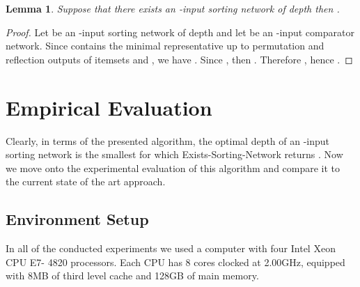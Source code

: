 \documentclass[13pt,a4paper]{article}
\newtheorem{lemma}[theorem]{Lemma}
\begin{document}
\begin{lemma}
\label{AlgoCorrectExistanceLemma}
Suppose that there exists an -input sorting network of depth  then .
\end{lemma}

\begin{proof}
Let  be an -input sorting network of depth  and let  be an -input comparator network. Since  contains the minimal representative up to permutation and reflection outputs of itemsets and , we have . Since , then . Therefore , hence .
\end{proof}





\section{Empirical Evaluation}
\label{sec:experiments}

Clearly, in terms of the presented algorithm, the optimal depth of an -input sorting network is the smallest  for which Exists-Sorting-Network returns . Now we move onto the experimental evaluation of this algorithm and compare it to the current state of the art approach.

\subsection{Environment Setup}
In all of the conducted experiments we used a computer with four Intel Xeon CPU E7- 4820 processors. Each CPU has 8 cores clocked at 2.00GHz, equipped with 8MB of third level cache and 128GB of main memory.
\end{document}
